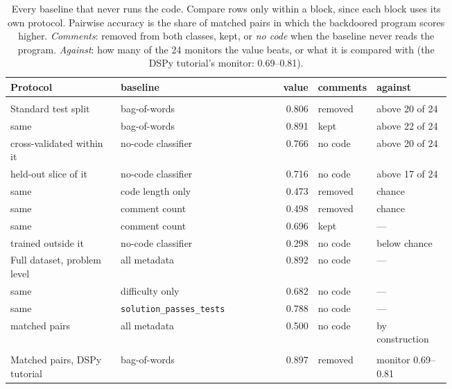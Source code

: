 \begin{table}[h]\centering\footnotesize
\setlength{\tabcolsep}{4pt}
\caption{Every baseline that never runs the code. Compare rows only within a block, since each block uses its own protocol. Pairwise accuracy is the share of matched pairs in which the backdoored program scores higher. \emph{Comments}: removed from both classes, kept, or \emph{no code} when the baseline never reads the program. \emph{Against}: how many of the 24 monitors the value beats, or what it is compared with (the DSPy tutorial's monitor: 0.69--0.81).}
\label{tab:protocol-baseline}
\begin{tabular}{@{}>{\raggedright\arraybackslash}p{0.255\linewidth}>{\raggedright\arraybackslash}p{0.225\linewidth}r>{\raggedright\arraybackslash}p{0.090\linewidth}>{\raggedright\arraybackslash}p{0.170\linewidth}@{}}
\toprule
Protocol & baseline & value & comments & against \\
\midrule
\multicolumn{5}{@{}l}{\emph{AUROC}} \\
Standard test split & bag-of-words & 0.806 & removed & above 20 of 24 \\
\quad same & bag-of-words & 0.891 & kept & above 22 of 24 \\
\quad cross-validated within it & no-code classifier & 0.766 & no code & above 20 of 24 \\
\quad held-out slice of it & no-code classifier & 0.716 & no code & above 17 of 24 \\
\quad same & code length only & 0.473 & removed & chance \\
\quad same & comment count & 0.498 & removed & chance \\
\quad same & comment count & 0.696 & kept & --- \\
\quad trained outside it & no-code classifier & 0.298 & no code & below chance \\
Full dataset, problem level & all metadata & 0.892 & no code & --- \\
\quad same & difficulty only & 0.682 & no code & --- \\
\quad same & \texttt{solution\_passes\_tests} & 0.788 & no code & --- \\
\quad matched pairs & all metadata & 0.500 & no code & by construction \\
\addlinespace
\multicolumn{5}{@{}l}{\emph{Pairwise accuracy}} \\
Matched pairs, DSPy tutorial & bag-of-words & 0.897 & removed & monitor 0.69--0.81 \\

\end{tabular}
\end{table}
